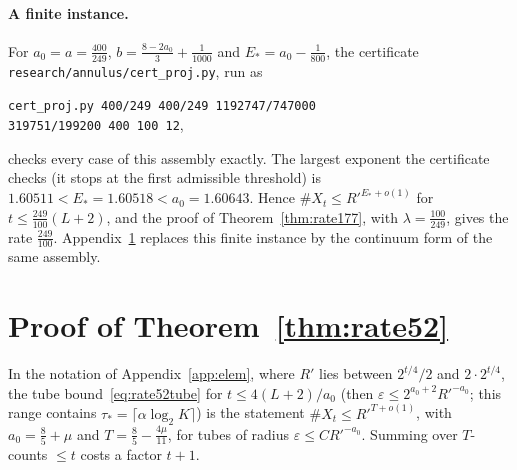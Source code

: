 \documentclass[aps,prx,twocolumn,superscriptaddress,nofootinbib,longbibliography]{revtex4-2}
\theoremstyle{plain}
\theoremstyle{definition}
\theoremstyle{remark}
\begin{document}
\paragraph{A finite instance.} For $a_0=a=\tfrac{400}{249}$, $b=\tfrac{8-2a_0}3+\tfrac1{1000}$ and $E_*=a_0-\tfrac1{800}$, the certificate \texttt{research/\allowbreak annulus/\allowbreak cert\_proj.py}, run as
\begin{center}\small\texttt{cert\_proj.py 400/249 400/249 1192747/747000}\\ \texttt{319751/199200 400 100 12},\end{center}
checks every case of this assembly exactly. The largest exponent the certificate checks (it stops at the first admissible threshold) is $1.60511<E_*=1.60518<a_0=1.60643$. Hence $\#X_t\le R'^{E_*+o(1)}$ for $t\le\tfrac{249}{100}(L+2)$, and the proof of Theorem~\ref{thm:rate177}, with $\lambda=\tfrac{100}{249}$, gives the rate $\tfrac{249}{100}$. Appendix~\ref{app:rate52} replaces this finite instance by the continuum form of the same assembly.

\section{Proof of Theorem~\ref{thm:rate52}}\label{app:rate52}

In the notation of Appendix~\ref{app:elem}, where $R'$ lies between $2^{t/4}/2$ and $2\cdot2^{t/4}$, the tube bound~\eqref{eq:rate52tube} for $t\le4(L+2)/a_0$ (then $\varepsilon\le2^{a_0+2}R'^{-a_0}$; this range contains $\tau_*=\lceil\alpha\log_2K\rceil$) is the statement $\#X_t\le R'^{T+o(1)}$, with $a_0=\tfrac85+\mu$ and $T=\tfrac85-\tfrac{4\mu}{11}$, for tubes of radius $\varepsilon\le CR'^{-a_0}$. Summing over $T$-counts $\le t$ costs a factor $t+1$.
\end{document}
